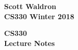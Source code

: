 \documentclass{article}%
\begin{document}
\begin{flushright}
\textbf{Scott Waldron \\
CS330 Winter 2018}
\end{flushright}

\begin{flushleft}
\textbf{CS330 \\
Lecture Notes} \\
\end{flushleft}
\
\end{document}
